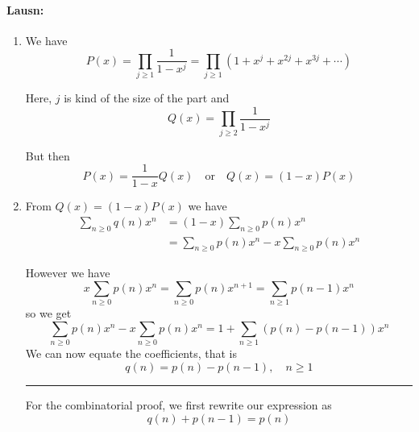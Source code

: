 \documentclass[a4paper,notitlepage]{article}
\theoremstyle{plain}
\theoremstyle{definition}
\begin{document}
\paragraph{Lausn:}
\begin{enumerate}
    \item We have
        \begin{equation*}
            P(x) = \prod_{j\geq 1} \frac{1}{1-x^j} = \prod_{j \geq 1} (1+x^j + x^{2j} + x^{3j}+ \cdots)
        \end{equation*}

        Here, $j$ is kind of the size of the part and
        \begin{equation*}
            Q(x) = \prod_{j\geq 2} \frac{1}{1-x^j}
        \end{equation*}

        But then
        \begin{equation*}
            P(x) = \frac{1}{1-x}Q(x) \quad \text{or}\quad Q(x) = (1-x)P(x)
        \end{equation*}

    \item From $Q(x) = (1-x)P(x)$ we have
        \begin{align*}
            \sum_{n \geq 0} q(n)x^n &= (1-x)\sum_{n \geq 0}p(n)x^n \\
            &= \sum_{n \geq 0}p(n)x^n - x \sum_{n \geq 0}p(n)x^n
        \end{align*}

        However we have
        \begin{equation*}
            x\sum_{n\geq 0}p(n)x^n = \sum_{n\geq 0}p(n)x^{n+1} = \sum_{n\geq 1} p(n-1)x^n
        \end{equation*}
        so we get
        \begin{equation*}
            \sum_{n \geq 0}p(n)x^n - x \sum_{n \geq 0}p(n)x^n = 1 + \sum_{n \geq 1}(p(n)-p(n-1))x^n
        \end{equation*}
        We can now equate the coefficients, that is
        \begin{equation*}
            q(n) = p(n) - p(n-1),\quad n\geq 1
        \end{equation*}

        \begin{center}
            \rule{25em}{0.5pt}
        \end{center}

        For the combinatorial proof, we first rewrite our expression as
        \begin{equation*}
            q(n) + p(n-1) = p(n)
        \end{equation*}
        

\end{enumerate}
\end{document}
